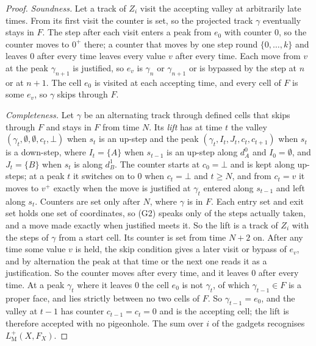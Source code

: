 \documentclass{lmcs}
\theoremstyle{definition}
\theoremstyle{remark}
\providecommand{\LMp}[1]{L^{+}_{\mathrm{M}}(#1)}
\begin{document}
\begin{proof}
\emph{Soundness.} Let a track of $Z_i$ visit the accepting valley at arbitrarily late times. From its first visit the
counter is set, so the projected track $\gamma$ eventually stays in $F$. The step after each visit enters a peak from
$e_0$ with counter $0$, so the counter moves to $0^+$ there; a counter that moves by one step round
$\{0,\dots,k\}$ and leaves $0$ after every time leaves every value $v$ after every time.
Each move from $v$ at the peak $\gamma_{n+1}$ is justified, so $e_v$ is $\gamma_n$ or $\gamma_{n+1}$ or is bypassed
by the step at $n$ or at $n+1$. The cell $e_0$ is visited at each accepting time, and every cell of $F$ is some $e_v$, so
$\gamma$ skips through $F$.

\emph{Completeness.} Let $\gamma$ be an alternating track through defined cells that skips through $F$ and stays in
$F$ from time $N$. Its \emph{lift} has at time $t$ the valley $(\gamma_t,\emptyset,\emptyset,c_t,\bot)$ when $s_t$ is
an up-step and the peak $(\gamma_t,I_t,J_t,c_t,c_{t+1})$ when $s_t$ is a down-step, where $I_t=\{A\}$ when $s_{t-1}$
is an up-step along $d^0_A$ and $I_0=\emptyset$, and $J_t=\{B\}$ when $s_t$ is along
$d^1_B$. The counter starts at $c_0=\bot$ and
is kept along up-steps; at a peak $t$ it switches on to $0$ when $c_t=\bot$ and $t\geq N$, and from $c_t=v$ it moves
to $v^+$ exactly when the move is justified at $\gamma_t$ entered along $s_{t-1}$ and left along
$s_t$. Counters are set only after $N$, where $\gamma$ is in $F$. Each
entry set and exit set holds one set of coordinates, so (G2) speaks only of the steps actually taken, and a move
made exactly when justified meets it. So the lift is a track of $Z_i$ with the steps of $\gamma$ from a start
cell. Its counter is set from
time $N+2$ on. After any time some value $v$ is held, the skip condition gives a later visit or bypass of $e_v$, and
by alternation the peak at that time or the next one reads it as a justification. So the counter moves after every
time, and it leaves $0$ after every time. At a peak
$\gamma_t$ where it leaves $0$ the cell $e_0$ is not $\gamma_t$, of which $\gamma_{t-1}\in F$ is a proper face, and
lies strictly between no two cells of $F$.
So $\gamma_{t-1}=e_0$, and the valley at $t-1$ has counter $c_{t-1}=c_t=0$ and is the accepting cell; the lift is
therefore accepted with no pigeonhole.
The sum over $i$ of the gadgets recognises $\LMp{X,F_X}$.


\end{proof}
\end{document}
